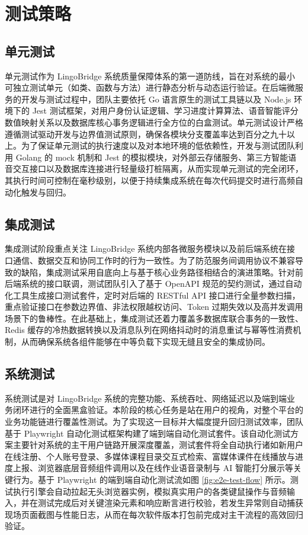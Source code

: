 \chapter{测试策略}

\section{单元测试}

单元测试作为 LingoBridge 系统质量保障体系的第一道防线，旨在对系统的最小可独立测试单元（如类、函数与方法）进行静态分析与动态运行验证。在后端微服务的开发与测试过程中，团队主要依托 Go 语言原生的测试工具链以及 Node.js 环境下的 Jest 测试框架，对用户身份认证逻辑、学习进度计算算法、语音智能评分数值映射关系以及数据库核心事务逻辑进行全方位的白盒测试。单元测试设计严格遵循测试驱动开发与边界值测试原则，确保各模块分支覆盖率达到百分之九十以上。为了保证单元测试的执行速度以及对本地环境的低依赖性，开发与测试团队利用 Golang 的 mock 机制和 Jest 的模拟模块，对外部云存储服务、第三方智能语音交互接口以及数据库连接进行轻量级打桩隔离，从而实现单元测试的完全闭环，其执行时间可控制在毫秒级别，以便于持续集成系统在每次代码提交时进行高频自动化触发与回归。

\section{集成测试}

集成测试阶段重点关注 LingoBridge 系统内部各微服务模块以及前后端系统在接口通信、数据交互和协同工作时的行为一致性。为了防范服务间调用协议不兼容导致的缺陷，集成测试采用自底向上与基于核心业务路径相结合的演进策略。针对前后端系统的接口联调，测试团队引入了基于 OpenAPI 规范的契约测试，通过自动化工具生成接口测试套件，定时对后端的 RESTful API 接口进行全量参数扫描，重点验证接口在参数边界值、非法权限越权访问、Token 过期失效以及高并发调用场景下的鲁棒性。在此基础上，集成测试还着力覆盖多数据库联合事务的一致性、Redis 缓存的冷热数据转换以及消息队列在网络抖动时的消息重试与幂等性消费机制，从而确保系统各组件能够在中等负载下实现无缝且安全的集成协同。

\section{系统测试}

系统测试是对 LingoBridge 系统的完整功能、系统吞吐、网络延迟以及端到端业务闭环进行的全面黑盒验证。本阶段的核心任务是站在用户的视角，对整个平台的业务功能链进行覆盖性测试。为了实现这一目标并大幅度提升回归测试效率，团队基于 Playwright 自动化测试框架构建了端到端自动化测试套件。该自动化测试方案主要针对系统的主干用户链路开展深度覆盖，测试套件将全自动执行诸如新用户在线注册、个人账号登录、多媒体课程目录交互式检索、富媒体课件在线播放与进度上报、浏览器底层音频组件调用以及在线作业语音录制与 AI 智能打分展示等关键行为。基于 Playwright 的端到端自动化测试流如图 \ref{fig:e2e-test-flow} 所示。测试执行引擎会自动拉起无头浏览器实例，模拟真实用户的各类键鼠操作与音频输入，并在测试完成后对关键渲染元素和响应断言进行校验，若发生异常则自动捕获现场页面截图与性能日志，从而在每次软件版本打包前完成对主干流程的高效回归验证。

